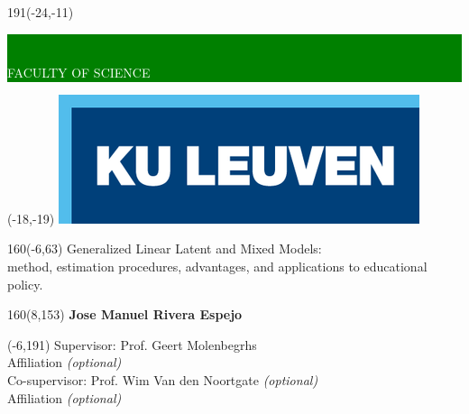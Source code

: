 \documentclass[12pt,a4paper,oneside]{book}
\begin{document}
%
\graphicspath{{./images/}} 	          %
%
\thispagestyle{empty}
\newcommand{\form}[1]{\scalebox{1.087}{\boldmath{#1}}}
\sffamily
%
\begin{textblock}{191}(-24,-11)
\colorbox{green}{\hspace{139mm}\ \parbox[c][18truemm]{52mm}{\textcolor{white}{FACULTY OF SCIENCE}}}
\end{textblock}
%
\begin{textblock}{70}(-18,-19)
\textblockcolour{}
\includegraphics*[height=19.8truemm]{LogoKULeuven}
\end{textblock}
%
\begin{textblock}{160}(-6,63)
\textblockcolour{}
\vspace{-\parskip}
\flushleft
\fontsize{40}{42}\selectfont \textcolor{bluetitle}{Generalized Linear Latent and Mixed Models:}\\[1.5mm]
\fontsize{20}{22}\selectfont method, estimation procedures, advantages, and applications to educational policy. \\
\end{textblock}
%
\begin{textblock}{160}(8,153)
\textblockcolour{}
\vspace{-\parskip}
\flushright
\fontsize{14}{16}\selectfont \textbf{Jose Manuel Rivera Espejo}
\end{textblock}
%
\begin{textblock}{70}(-6,191)
\textblockcolour{}
\vspace{-\parskip}
\flushleft
Supervisor: Prof. Geert Molenbegrhs \\[-2pt]
\textcolor{blueaff}{Affiliation \textsl{(optional)}}\\[5pt]
Co-supervisor: Prof. Wim Van den Noortgate \textsl{(optional)}\\[-2pt]
\textcolor{blueaff}{Affiliation \textsl{(optional)}}\\[5pt]
\end{textblock}
\end{document}
